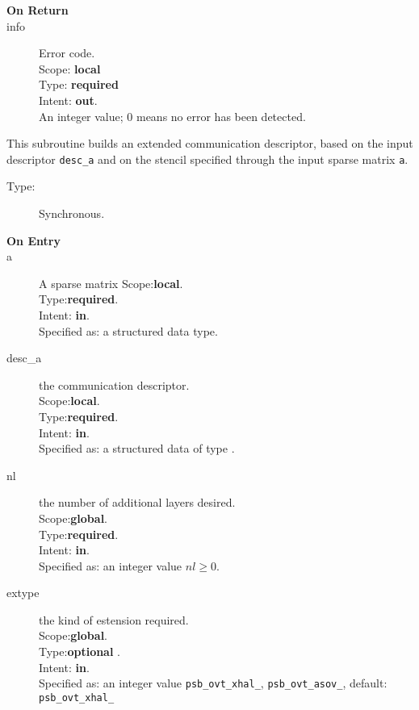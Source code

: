 \begin{description}
\item[\bf On Return]
\item[info] Error code.\\
Scope: {\bf local} \\
Type: {\bf required} \\
Intent: {\bf out}.\\
An integer value; 0 means no error has been detected. 
\end{description}



%
%


This subroutine builds an extended communication descriptor, based on
the input descriptor \verb|desc_a| and on the stencil specified
through the input sparse matrix \verb|a|. 
\begin{description}
\item[Type:] Synchronous.
\item[\bf On Entry]
\item[a] A sparse matrix
Scope:{\bf local}.\\
Type:{\bf required}.\\
Intent: {\bf in}.\\
Specified as: a structured data type.
\item[desc\_a] the communication descriptor.\\
Scope:{\bf local}.\\
Type:{\bf required}.\\
Intent: {\bf in}.\\
Specified as: a structured data of type \spdata.
\item[nl] the number of additional layers desired.\\
Scope:{\bf global}.\\
Type:{\bf required}.\\
Intent: {\bf in}.\\
Specified as: an integer value $nl\ge 0$. 
\item[extype] the kind of estension required.\\
Scope:{\bf global}.\\
Type:{\bf optional }.\\
Intent: {\bf in}.\\
Specified as: an integer value
\verb|psb_ovt_xhal_|, \verb|psb_ovt_asov_|, default: \verb|psb_ovt_xhal_|

\end{description}

